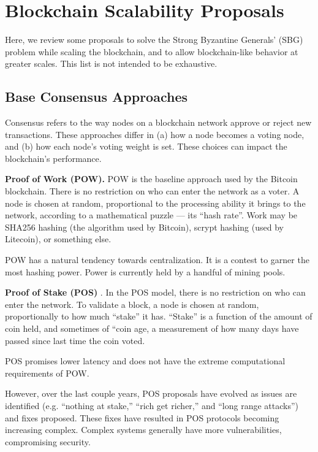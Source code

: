 \section{Blockchain Scalability Proposals}\label{appendix:blockchain_scalability}

Here, we review some proposals to solve the Strong Byzantine Generals’ (SBG) problem while scaling the blockchain, and to allow blockchain-like behavior at greater scales.
This list is not intended to be exhaustive.

\subsection{Base Consensus Approaches}

Consensus refers to the way nodes on a blockchain network approve or reject new transactions.
These approaches differ in (a) how a node becomes a voting node, and (b) how each node’s voting weight is set.
These choices can impact the blockchain’s performance.

\medskip
\noindent\textbf{Proof of Work (POW).} POW is the baseline approach used by the Bitcoin blockchain.
There is no restriction on who can enter the network as a voter. 
A node is chosen at random, proportional to the processing ability it brings to the network, according to a mathematical puzzle — its “hash rate”. 
Work \cite{back2002hashcash} may be SHA256 hashing (the algorithm used by Bitcoin), scrypt hashing (used by Litecoin), or something else.

POW has a natural tendency towards centralization. It is a contest to garner the most hashing power. Power is currently held by a handful of mining pools.

\medskip
\noindent\textbf{Proof of Stake (POS)} \cite{bitcoin2015pos}. In the POS model, there is no restriction on who can enter the network. 
To validate a block, a node is chosen at random, proportionally to how much “stake” it has. 
“Stake” is a function of the amount of coin held, and sometimes of “coin age, a measurement of how many days have passed since last time the coin voted.

POS promises lower latency and does not have the extreme computational requirements of POW.

However, over the last couple years, POS proposals have evolved as issues are identified (e.g. “nothing at stake,” “rich get richer,” and “long range attacks”) and fixes proposed. 
These fixes have resulted in POS protocols becoming increasing complex. 
Complex systems generally have more vulnerabilities, compromising security.

